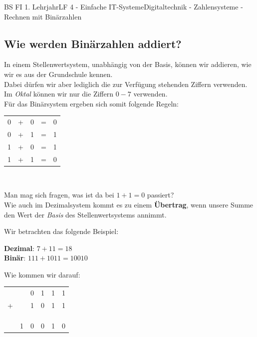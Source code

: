\documentclass[11pt,twocolumn,oneside,openany,headings=optiontotoc,11pt,numbers=noenddot]{article}
\begin{document}
\begin{worksheet}{BS FI 1. Lehrjahr}{LF 4 - Einfache IT-Systeme}{Digitaltechnik - Zahlensysteme - Rechnen mit Binärzahlen}
		\subsection{Wie werden Binärzahlen addiert?}
		In einem Stellenwertsystem, unabhängig von der Basis, können wir addieren, wie wir es aus der Grundschule kennen.\\
		Dabei dürfen wir aber lediglich die zur Verfügung stehenden Ziffern verwenden.\\
		\tiny{Im \textit{Oktal} können wir nur die Ziffern \(0 - 7\) verwenden.}\normalsize\\
		Für das Binärsystem ergeben sich somit folgende Regeln:\\
		\par\noindent
		\begin{tabularx}{0.48\textwidth}{ccccc}
			0 & + & 0 & = & 0\\
			0 & + & 1 & = & 1\\
			1 & + & 0 & = & 1\\
			1 & + & 1 & = & 0
		\end{tabularx}\\
		\par\noindent
		Man mag sich fragen, was ist da bei \(1 + 1 = 0\) passiert?\\
		Wie auch im Dezimalsystem kommt es zu einem \textbf{Übertrag}, wenn unsere Summe den Wert der \textit{Basis} des Stellenwertsystems annimmt.\\
		\begin{framed}
			\noindent
			Wir betrachten das folgende Beispiel:\\
			\par\noindent
			\textbf{Dezimal}: \(7 + 11 = 18\)\\
			\textbf{Binär}: \( 111 + 1011 = 10010\)\\
			\par\noindent
			Wie kommen wir darauf:\\
			\par\noindent
			\begin{tabularx}{0.4\textwidth}{llllll}
				& & 0 & 1 & 1 & 1\\
				+ & & 1 & 0 & 1 & 1\\
				\\
				\tiny{\color{codegray}{Übertrag}} & \color{codegray}{1} & \color{codegray}{1} & \color{codegray}{1} & \color{codegray}{1} & \\
				\cline{1-6}
				\\
				& 1 & 0 & 0 & 1 & 0\\

\end{tabularx}
\end{framed}
\end{worksheet}
\end{document}
